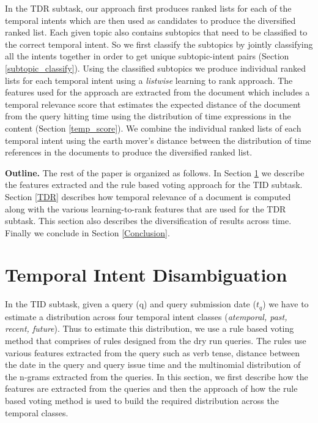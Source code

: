 \documentclass{sig-alternate}
\begin{document}
In the TDR subtask, our approach first produces ranked lists for each of the temporal intents which are then used as candidates to produce the diversified ranked list. Each given topic also contains subtopics that need to be classified to the correct temporal intent. So we first classify the subtopics by jointly classifying all the intents together in order to get unique subtopic-intent pairs (Section \ref{subtopic_classify}). Using the classified subtopics we produce individual ranked lists for each temporal intent using a \textit{listwise} learning to rank approach. The features used for the approach are extracted from the document which includes a temporal relevance score that estimates the expected distance of the document from the query hitting time using the distribution of time expressions in the content (Section \ref{temp_score}). We combine the individual ranked lists of each temporal intent using the earth mover's distance between the distribution of time references in the documents to produce the diversified ranked list.

\textbf{Outline.} The rest of the paper is organized as follows. In Section \ref{TID} we describe the features extracted and the rule based voting approach for the TID subtask. Section \ref{TDR} describes how temporal relevance of a document is computed along with the various \textsf{learning-to-rank} features that are used for the TDR subtask. This section also describes the diversification of results across time. Finally we conclude in Section \ref{Conclusion}.
\section{Temporal Intent Disambiguation}\label{TID}
In the TID subtask, given a query (q) and query submission date ($t_{q}$) we have to estimate a distribution across four temporal intent classes (\textit{atemporal, past, recent, future}). Thus to estimate this distribution, we use a rule based voting method that comprises of rules designed from the dry run queries. The rules use various features extracted from the query such as verb tense, distance between the date in the query and query issue time and the multinomial distribution of the n-grams extracted from the queries. In this section, we first describe how the features are extracted from the queries and then the approach of how the rule based voting method is used to build the required distribution across the temporal classes.
\end{document}
